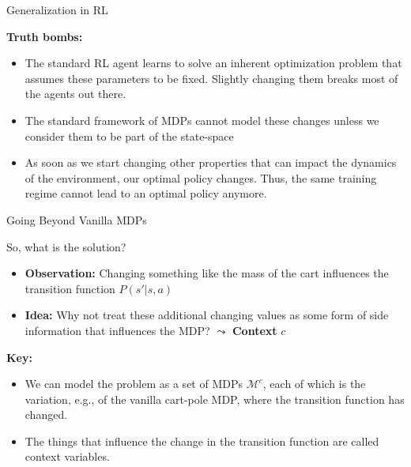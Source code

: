 \documentclass[aspectratio=169]{../latex_main/tntbeamer}  %
\begin{document}
\begin{frame}{Generalization in RL}

    \textbf{Truth bombs:}
    
    \begin{itemize}
        \item The standard RL agent learns to solve an inherent optimization problem that assumes these parameters to be fixed. Slightly changing them breaks most of the agents out there.
        \item The standard framework of MDPs cannot model these changes unless we consider them to be part of the state-space
        \item As soon as we start changing other properties that can impact the dynamics of the environment, our optimal policy changes. Thus, the same training regime cannot lead to an optimal policy anymore.
    \end{itemize}

\end{frame}

\begin{frame}{Going Beyond Vanilla MDPs}

    So, what is the solution?
    
    \begin{itemize}
        \item \textbf{Observation:} Changing something like the mass of the cart influences the transition function $P(s'|s,a)$ 
        \pause
        \item \textbf{Idea:} Why not treat these additional changing values as some  form of side information that influences the MDP? \pause  $\leadsto$ \textbf{Context} $c$
    \end{itemize}
    
    \pause
    \textbf{Key:} 
    \begin{itemize}
        \item We can model the problem as a set of MDPs $\mathcal{M}^c$, each of which is the variation, e.g., of the vanilla cart-pole MDP, where the transition function has changed. 
        \item The things that influence the change in the transition function are called context variables.
    \end{itemize}

\end{frame}
\end{document}
